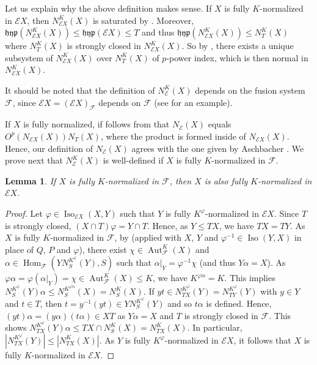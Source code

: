 \documentclass[reqno,11pt]{amsart}
\numberwithin{equation}{section}
\newtheorem{lemma}[equation]{Lemma}
\theoremstyle{definition}
\newcommand{\F}{\mathcal{F}}
\newcommand{\E}{\mathcal{E}}
\newcommand{\Hom}{\operatorname{Hom}}
\newcommand{\Aut}{\operatorname{Aut}}
\newcommand{\Iso}{\operatorname{Iso}}
\newcommand{\hyp}{\mathfrak{hyp}}
\renewcommand{\phi}{\varphi}
\begin{document}
Let us explain why the above definition makes sense. If $X$ is fully $K$-normalized in $\E X$, then $N_{\E
X}^K(X)$ is saturated by \cite[Theorem~I.5.5]{Aschbacher/Kessar/Oliver:2011}. Moreover, $\hyp(N_{\E X}^K(X))\leq \hyp(\E X)\leq T$ and
thus $\hyp(N_{\E X}^K(X))\leq N_T^K(X)$ where $N_T^K(X)$ is strongly closed in $N_{\E
X}^K(X)$. So by \cite[Theorem~I.7.4]{Aschbacher/Kessar/Oliver:2011}, there exists a
unique subsystem of $N_{\E X}^K(X)$ over $N_T^K(X)$ of $p$-power index, which is then normal in $N_{\E X}^K(X)$. 

\smallskip

It should be noted that the definition of $N_\E^K(X)$ depends on the
fusion system $\F$, since $\E X=(\E X)_\F$ depends on $\F$ (see \cite[p.7]{Henke/Lynd} for an example). %

\smallskip

If $X$ is fully normalized, if follows from \cite[Theorem~1]{Henke:2013} that $N_\E(X)$ equals $O^p(N_{\E X}(X))N_T(X)$, where the product is formed inside of $N_{\E X}(X)$. Hence, our definition of $N_\E(X)$ agrees with the one given by Aschbacher \cite[8.24]{Aschbacher:2011}. We prove next that $N_\E^K(X)$ is well-defined if $X$ is fully $K$-normalized in $\F$.


\begin{lemma}\label{L:FullyKNormalized}
 If $X$ is fully $K$-normalized in $\F$, then $X$ is also fully $K$-normalized in $\E X$.
\end{lemma}

\begin{proof}
Let $\phi\in\Iso_{\E X}(X,Y)$ such that $Y$ is fully $K^\phi$-normalized in $\E X$. Since $T$ is strongly closed, $(X\cap T)\phi=Y\cap T$. Hence, as $Y\leq TX$, we have $TX=TY$. As $X$ is fully $K$-normalized in $\F$, by \cite[Proposition~I.5.2]{Aschbacher/Kessar/Oliver:2011} (applied with $X$, $Y$ and $\phi^{-1}\in\Iso(Y,X)$ in place of $Q$, $P$ and $\phi$), there exist $\chi\in\Aut_\F^K(X)$ and $\alpha\in\Hom_\F(YN_S^{K^\phi}(Y),S)$ such that $\alpha|_Y=\phi^{-1}\chi$ (and thus $Y\alpha=X$). As $\phi\alpha=\phi(\alpha|_Y)=\chi\in\Aut_\F^K(X)\leq K$, we have $K^{\phi\alpha}=K$. This implies $N_S^{K^\phi}(Y)\alpha\leq N_S^{K^{\phi\alpha}}(X)=N_S^K(X)$. If $yt\in N_{TX}^{K^\phi}(Y)=N_{TY}^{K^\phi}(Y)$ with $y\in Y$ and $t\in T$, then $t=y^{-1}(yt)\in YN_S^{K^\phi}(Y)$ and so $t\alpha$ is defined. Hence, $(yt)\alpha=(y\alpha)(t\alpha)\in XT$ as $Y\alpha=X$ and $T$ is strongly closed in $\F$. This shows $N_{TX}^{K^\phi}(Y)\alpha\leq TX\cap N_S^K(X)=N_{TX}^K(X)$. In particular, $|N_{TX}^{K^\phi}(Y)|\leq |N_{TX}^K(X)|$. As $Y$ is fully $K^\phi$-normalized in $\E X$, it follows that $X$ is fully $K$-normalized in $\E X$. 
\end{proof}
\end{document}
